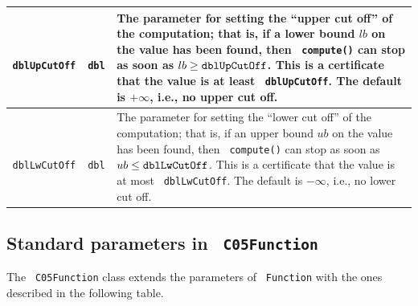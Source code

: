 \documentclass[a4paper]{article}
\newcommand{\code}[1]{\textrm{\texttt{\hyphenchar\font=200 #1}}}
\begin{document}
\begin{longtable}{|c|c|p{13.4cm}|}
 \hline
 \code{dblUpCutOff} & \code{dbl} & The parameter for setting the ``upper cut off'' of the computation; that is, if a lower bound $lb$ on the value has been found, then \code{compute()} can stop as soon as $lb \geq \code{dblUpCutOff}$. This is a certificate that the value is at least \code{dblUpCutOff}. The default is $+\infty$, i.e., no upper cut off.\\
 \hline
 \code{dblLwCutOff} & \code{dbl} & The parameter for setting the ``lower cut off'' of the computation; that is, if an upper bound $ub$ on the value has been found, then \code{compute()} can stop as soon as $ub \leq \code{dblLwCutOff}$. This is a certificate that the value is at most \code{dblLwCutOff}. The default is $-\infty$, i.e., no lower cut off.\\
 \hline
\end{longtable}

\subsection{Standard parameters in \code{C05Function}}

The \code{C05Function} class extends the parameters of \code{Function} with the ones described in the following table.
\end{document}

